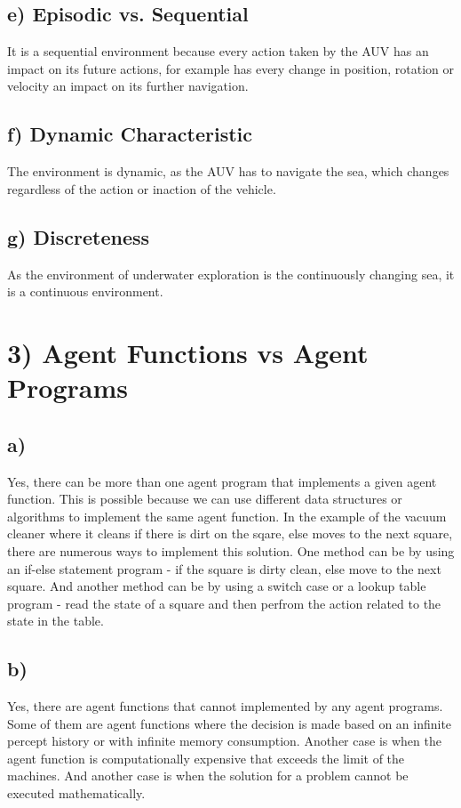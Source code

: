 \documentclass[12pt]{scrartcl}
\begin{document}
    \subsection*{e) Episodic vs. Sequential}
        It is a sequential environment because every action taken by the AUV has an impact on its future actions, 
        for example has every change in position, rotation or velocity an impact on its further navigation.

    \subsection*{f) Dynamic Characteristic}
        The environment is dynamic, as the AUV has to navigate the sea, which changes regardless of the action or inaction of the vehicle.

    \subsection*{g) Discreteness}
        As the environment of underwater exploration is the continuously changing sea, it is a continuous environment.

\section*{3) Agent Functions vs Agent Programs}
    \subsection*{a)}
        Yes, there can be more than one agent program that implements a given agent function. 
        This is possible because we can use different data structures or algorithms to implement the same agent function.
        In the example of the vacuum cleaner where it cleans if there is dirt on the sqare, else moves to the next square, there are numerous ways to implement this solution.
        One method can be by using an if-else statement program - if the square is dirty clean, else move to the next square.
        And another method can be by using a switch case or a lookup table program - read the state of a square and then perfrom the action related to the state in the table.

    \subsection*{b)}
        Yes, there are agent functions that cannot implemented by any agent programs.
        Some of them are agent functions where the decision is made based on an infinite percept history or with infinite memory consumption.
        Another case is when the agent function is computationally expensive that exceeds the limit of the machines.
        And another case is when the solution for a problem cannot be executed mathematically.
\end{document}
